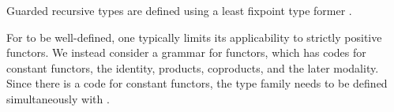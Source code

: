 \begin{AgdaAlign}
Guarded recursive types are defined using a least fixpoint
type former .
\begin{code}%
%
\>[4]\AgdaSpace{}%
\AgdaSymbol{:}\AgdaSpace{}%
\AgdaSpace{}%
\AgdaSymbol{\{}\AgdaSymbol{\}}\AgdaSpace{}%
\AgdaSpace{}%
\AgdaSpace{}%
\AgdaSpace{}%
\AgdaSpace{}%
\AgdaSpace{}%
\<%
\end{code}
\end{AgdaAlign}
For  to be well-defined, one typically limits
its applicability to strictly positive functors. We instead consider
a grammar   for functors, which has codes for constant functors,
the identity, products, coproducts, and the later modality.
Since there is a code for constant functors, the type family
 needs to be defined simultaneously with .
\begin{code}%
%
\>[2]\AgdaSpace{}%
\AgdaSpace{}%
\AgdaSymbol{:}\AgdaSpace{}%
\AgdaSpace{}%
\AgdaSpace{}%
\AgdaSpace{}%
\<%
\\
\>[2][@{}l@{\AgdaIndent{0}}]%
\>[4]\AgdaSpace{}%
\AgdaSymbol{:}\AgdaSpace{}%
\AgdaSpace{}%
\AgdaSymbol{\{}\AgdaSymbol{\}}\AgdaSpace{}%
\AgdaSpace{}%
\AgdaSpace{}%
\AgdaSpace{}%
\AgdaSpace{}%
\AgdaSpace{}%
\<%
\\
%
\>[4]\AgdaSpace{}%
\AgdaSymbol{:}\AgdaSpace{}%
\AgdaSpace{}%
\AgdaSymbol{\{}\AgdaSymbol{\}}\AgdaSpace{}%
\AgdaSpace{}%
\AgdaSpace{}%
\<%
\\
%
\>[4]\AgdaSpace{}%
\AgdaSpace{}%
\AgdaSymbol{:}\AgdaSpace{}%
\AgdaSpace{}%
\AgdaSymbol{\{}\AgdaSymbol{\}}\AgdaSpace{}%
\AgdaSpace{}%
\AgdaSpace{}%
\AgdaSpace{}%
\AgdaSpace{}%
\AgdaSpace{}%
\AgdaSpace{}%
\AgdaSpace{}%
\AgdaSpace{}%
\<%
\\
%
\>[4]\AgdaSpace{}%
\AgdaSymbol{:}\AgdaSpace{}%
\AgdaSpace{}%
\AgdaSpace{}%
\AgdaSpace{}%
\AgdaSpace{}%
\<%
\end{code}
